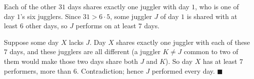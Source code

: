 Each of the other $31$ days shares exactly one juggler with day $1$, who is one of day $1$'s six jugglers. Since $31>6\cdot5$, some juggler $J$ of day $1$ is shared with at least $6$ other days, so $J$ performs on at least $7$ days.

Suppose some day $X$ lacks $J$. Day $X$ shares exactly one juggler with each of these $7$ days, and these jugglers are all different (a juggler $K\ne J$ common to two of them would make those two days share both $J$ and $K$). So day $X$ has at least $7$ performers, more than $6$. Contradiction; hence $J$ performed every day. $\blacksquare$
